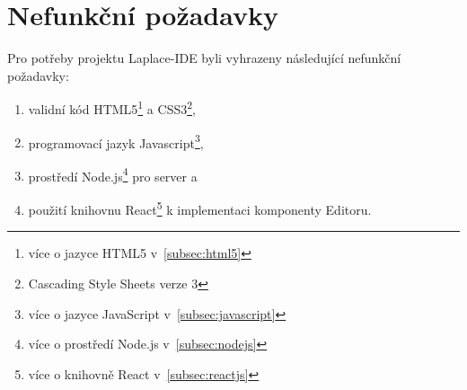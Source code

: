 \section{Nefunkční požadavky}\label{sec:nefuncniPozadavky}

Pro potřeby projektu Laplace-IDE byli vyhrazeny následující nefunkční požadavky:
\begin{enumerate}[label=N\arabic*.]
    \item validní kód HTML5\footnote{více o jazyce HTML5 v~\ref{subsec:html5}} a CSS3\footnote{Cascading Style Sheets verze 3},
    \item programovací jazyk Javascript\footnote{více o jazyce JavaScript v~\ref{subsec:javascript}},
    \item prostředí Node.js\footnote{více o prostředí Node.js v~\ref{subsec:nodejs}} pro server a
    \item použití knihovnu React\footnote{více o knihovně React v~\ref{subsec:reactjs}} k implementaci komponenty Editoru.
\end{enumerate}
